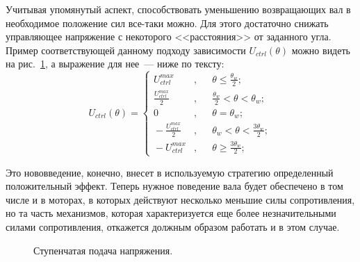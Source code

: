 \documentclass[12pt,a4paper,openany]{extarticle}
\begin{document}
Учитывая упомянутый аспект, способствовать уменьшению возвращающих вал в необходимое положение сил все-таки можно.
Для этого достаточно снижать управляющее напряжение с некоторого <<расстояния>> от заданного угла.
Пример соответствующей данному подходу зависимости $U_{ctrl}(\theta)$ можно видеть на рис.~\ref{4_graph}, а выражение для нее~--- ниже по тексту:
\begin{equation}\label{for_stairs}
	U_{ctrl}(\theta) =
	\left\{
	\begin{aligned}
		\!U_{ctrl}^{max}\!&, &&\theta \leqslant \frac{\theta_w}{2};\\
		\!\frac{\!U_{ctrl}^{max}}{2}&, &&\frac{\theta_w}{2} < \theta < \theta_w;\\ 
		\!0&, &&\theta = \theta_w;\\
		\!-\frac{\!U_{ctrl}^{max}}{2}&, &&\theta_w < \theta < \frac{3\theta_w}{2};\\	
		\!-U_{ctrl}^{max}\!&, &&\theta \geqslant \frac{3\theta_w}{2};	
	\end{aligned}
	\right.
\end{equation}

Это нововведение, конечно, внесет в используемую стратегию определенный положительный эффект.
Теперь нужное поведение вала будет обеспечено в том числе и в моторах, в которых действуют несколько меньшие силы сопротивления, но та часть механизмов, которая характеризуется еще более незначительными силами сопротивления, откажется должным образом работать и в этом случае.

\begin{figure}[h]
	\noindent{}
	\caption{Ступенчатая подача напряжения.}
	\label{4_graph}
\end{figure}
\end{document}
